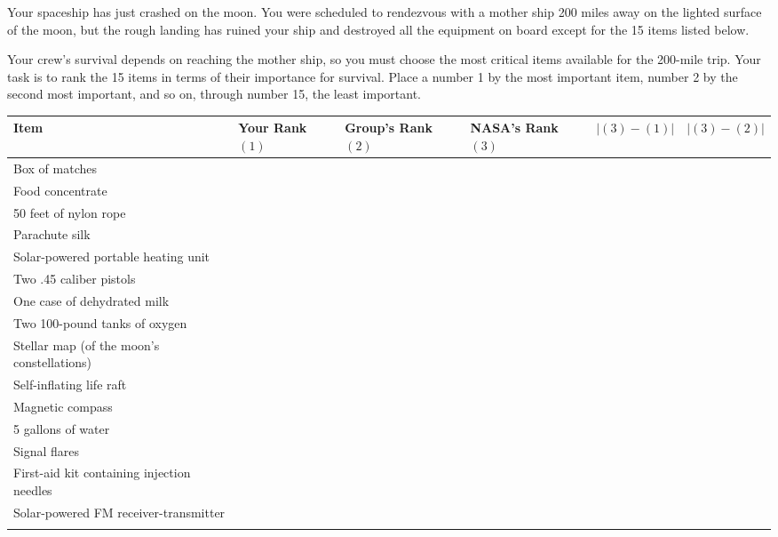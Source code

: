 Your spaceship has just crashed on the moon. You were scheduled to rendezvous
with a mother ship 200 miles away on the lighted surface of the moon, but the
rough landing has ruined your ship and destroyed all the equipment on board
except for the 15 items listed below.

Your crew's survival depends on reaching the mother ship, so you must choose
the most critical items available for the 200-mile trip. Your task is to rank
the 15 items in terms of their importance for survival.  Place a number 1 by
the most important item, number 2 by the second most important, and so on,
through number 15, the least important.

\begin{center}
    \begin{tabular}{|>{\raggedright}p{7cm}|m{1.5cm}|m{1.5cm}|m{1.5cm}|m{1.7cm}|m{1.7cm}|}
        \hline
        Item & Your Rank $(1)$ & Group's Rank $(2)$ & NASA's Rank $(3)$ &
            $\left\lvert(3)-(1)\right\rvert$ &
            $\left\lvert(3)-(2)\right\rvert$ \\ \hline
        Box of matches & & & & & \\[0.7em] \hline
        Food concentrate & & & & & \\[0.7em] \hline
        50 feet of nylon rope & & & & & \\[0.7em] \hline
        Parachute silk & & & & & \\[0.7em] \hline
        Solar-powered portable heating unit & & & & & \\[0.7em] \hline
        Two .45 caliber pistols & & & & & \\[0.7em] \hline
        One case of dehydrated milk & & & & & \\[0.7em] \hline
        Two 100-pound tanks of oxygen & & & & & \\[0.7em] \hline
        Stellar map (of the moon's constellations) & & & & & \\[0.7em] \hline
        Self-inflating life raft & & & & & \\[0.7em] \hline
        Magnetic compass & & & & & \\[0.7em] \hline
        5 gallons of water & & & & & \\[0.7em] \hline
        Signal flares & & & & & \\[0.7em] \hline
        First-aid kit containing injection needles & & & & & \\[0.7em] \hline
        Solar-powered FM receiver-transmitter & & & & & \\[0.7em] \hline
        \multicolumn{4}{|p{10.5cm}|}{{\bf Total}} & & \\[0.7em] \hline
    \end{tabular}
\end{center}

